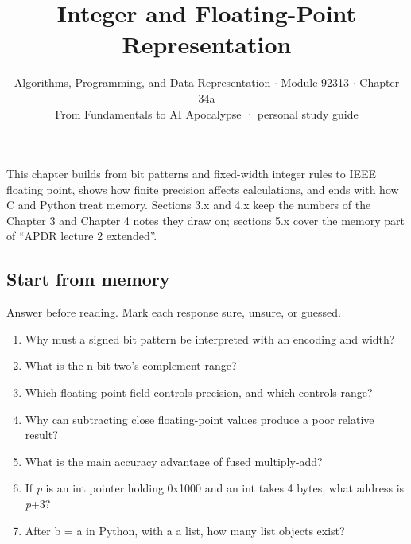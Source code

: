 \documentclass[11pt]{article}
\title{\sffamily\bfseries\color{FAUblue}Integer and Floating-Point Representation}
\author{Algorithms, Programming, and Data Representation \ensuremath{\cdot} Module 92313 \ensuremath{\cdot} Chapter 34a\\[2pt]\small From Fundamentals to AI Apocalypse · personal study guide}
\date{}
\begin{document}
\maketitle
\begingroup\footnotesize\setlength{\parskip}{0pt}\tableofcontents\endgroup
\clearpage

{\large This chapter builds from bit patterns and fixed-width integer rules to IEEE floating point, shows how finite precision affects calculations, and ends with how C and Python treat memory. Sections 3.x and 4.x keep the numbers of the Chapter 3 and Chapter 4 notes they draw on; sections 5.x cover the memory part of “APDR lecture 2 extended”.}


\begin{keepsection}
\section{Start from memory}

Answer before reading. Mark each response sure, unsure, or guessed.

\begin{enumerate}
\item Why must a signed bit pattern be interpreted with an encoding and width?
\item What is the n-bit two’s-complement range?
\item Which floating-point field controls precision, and which controls range?
\item Why can subtracting close floating-point values produce a poor relative result?
\item What is the main accuracy advantage of fused multiply-add?
\item If \textit{p} is an int pointer holding 0x1000 and an int takes 4 bytes, what address is \textit{p}+3?
\item After b = a in Python, with a a list, how many list objects exist?
\end{enumerate}

\end{keepsection}
\end{document}
